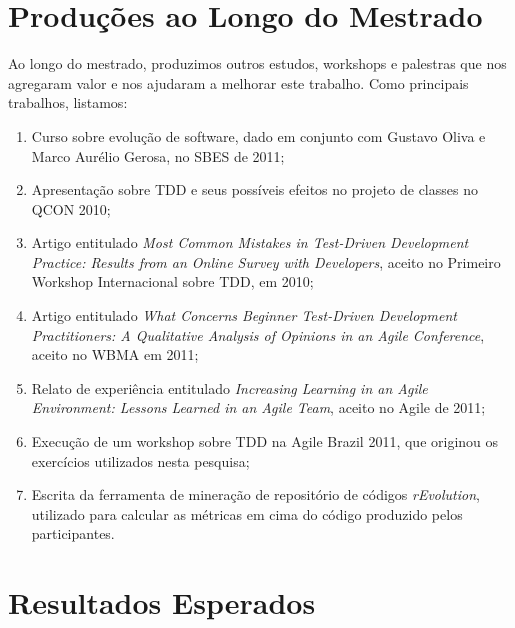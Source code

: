 \section{Produções ao Longo do Mestrado}

Ao longo do mestrado, produzimos outros estudos, workshops e palestras que 
nos agregaram valor e nos ajudaram a melhorar este trabalho. Como principais
trabalhos, listamos:

\begin{enumerate}
	
	\item Curso sobre evolução de software, dado em conjunto com Gustavo Oliva e
	Marco Aurélio Gerosa, no SBES de 2011;
	
	\item Apresentação sobre TDD e seus possíveis efeitos no projeto de classes no
	QCON 2010;
	
	\item Artigo entitulado \textit{Most Common Mistakes in Test-Driven Development Practice: Results from an Online Survey with Developers},
	aceito no Primeiro Workshop Internacional sobre TDD, em 2010;
	
	\item Artigo entitulado \textit{What Concerns Beginner Test-Driven Development Practitioners: A Qualitative Analysis of Opinions in an Agile Conference},
	aceito no WBMA em 2011;
	
	\item Relato de experiência entitulado \textit{Increasing Learning in an Agile Environment: Lessons Learned in an Agile Team}, aceito
	no Agile de 2011;
	
	\item Execução de um workshop sobre TDD na Agile Brazil 2011, que originou os exercícios utilizados nesta pesquisa;
	
	\item Escrita da ferramenta de mineração de repositório de códigos \textit{rEvolution}, utilizado para calcular as métricas
	em cima do código produzido pelos participantes.
	
\end{enumerate}

\section{Resultados Esperados}

